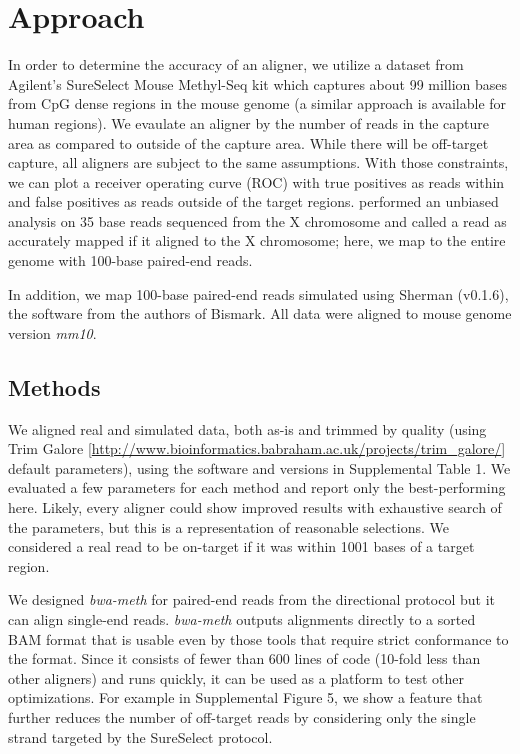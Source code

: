 \documentclass{bioinfo}
\begin{document}
\section{Approach}
In order to determine the accuracy of an aligner,
we utilize a dataset from Agilent's SureSelect Mouse Methyl-Seq kit which
captures about
99 million bases from CpG dense regions in the mouse genome (a similar
approach is available for human regions).
We evaulate an aligner by the number of reads in the capture area as compared
to outside of the capture area. While there will be off-target capture, all
aligners are subject to the same assumptions. With those constraints, we can
plot a receiver operating curve (ROC) with true positives as reads within
and false positives as reads outside of the target regions.
\citealp{shrestha} performed an unbiased analysis on 35 base reads sequenced from
the X chromosome and called a read as accurately mapped if it aligned
to the X chromosome; here, we map to the entire genome with 100-base paired-end reads.

In addition, we map 100-base paired-end reads simulated using
Sherman (v0.1.6), the software from the authors of Bismark. All data were
aligned to mouse genome version \textit{mm10}.

\begin{methods}
\section{Methods}
We aligned real and simulated data, both as-is and trimmed by quality (using Trim Galore
[\href{http://www.bioinformatics.babraham.ac.uk/projects/trim\_galore/}{http://www.bioinformatics.babraham.ac.uk/projects/trim\_galore/}]
default parameters), using the software and versions in Supplemental Table 1.
We evaluated a few parameters for each method and report only the
best-performing here. Likely, every aligner could show improved results with
exhaustive search of the parameters, but this is a representation of
reasonable selections.
We considered a real read to be on-target if it was within 1001 bases
of a target region.

We designed \textit{bwa-meth} for paired-end reads from the directional
protocol but it can align single-end reads. \textit{bwa-meth} outputs alignments
directly to a sorted BAM format that is usable even by those tools that require
strict conformance to the format. Since it consists
of fewer than 600 lines of code (10-fold less than other aligners) and runs
quickly, it can be used as a platform to test other optimizations. For example
in Supplemental Figure 5, we show a feature that further reduces the
number of off-target reads by considering only the single strand targeted by
the SureSelect protocol.

\end{methods}
\end{document}
